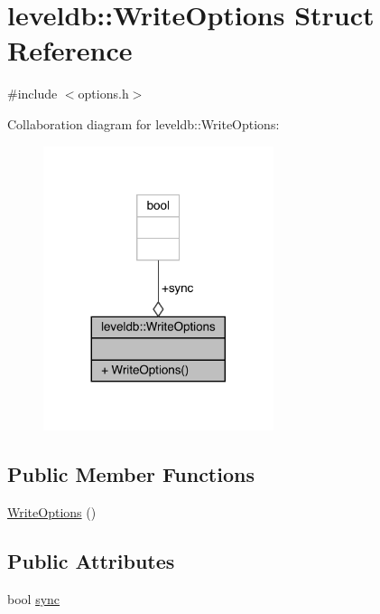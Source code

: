 \hypertarget{structleveldb_1_1_write_options}{}\section{leveldb\+::Write\+Options Struct Reference}
\label{structleveldb_1_1_write_options}


{\ttfamily \#include $<$options.\+h$>$}



Collaboration diagram for leveldb\+::Write\+Options\+:
\nopagebreak
\begin{figure}[H]
\begin{center}
\leavevmode
\includegraphics[width=191pt]{structleveldb_1_1_write_options__coll__graph}
\end{center}
\end{figure}
\subsection*{Public Member Functions}
\begin{DoxyCompactItemize}
\item 
\mbox{\hyperlink{structleveldb_1_1_write_options_a8cdd3e1a65d956d4bcb5e43fa9aee199}{Write\+Options}} ()
\end{DoxyCompactItemize}
\subsection*{Public Attributes}
\begin{DoxyCompactItemize}
\item 
bool \mbox{\hyperlink{structleveldb_1_1_write_options_a07cd165ae5ed59a763001286e14ba47e}{sync}}
\end{DoxyCompactItemize}


